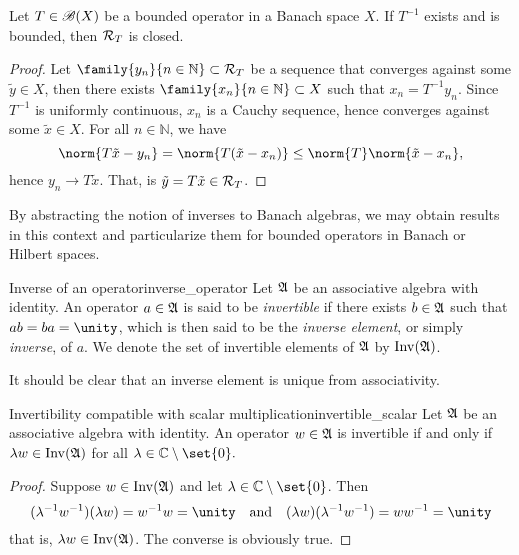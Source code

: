 \begin{corollary}
    Let \(T\in \mathscr{B}(X)\) be a bounded operator in a Banach space \(X\). If \(T^{-1}\) exists and is bounded, then \(\mathcal{R}_{T}\) is closed.
\end{corollary}
\begin{proof}
    Let \(\family{y_n}{n\in \mathbb{N}} \subset \range{T}\) be a sequence that converges against some \(\tilde{y} \in X\), then there exists \(\family{x_n}{n \in \mathbb{N}} \subset X\) such that \(x_n = T^{-1} y_n\). Since \(T^{-1}\) is uniformly continuous, \(x_n\) is a Cauchy sequence, hence converges against some \(\tilde{x} \in X\). For all \(n \in \mathbb{N}\), we have
    \begin{equation*}
        \norm{T\tilde{x} - y_n} = \norm{T(\tilde{x} - x_n)} \leq \norm{T}\norm{\tilde{x} - x_n},
    \end{equation*}
    hence \(y_n \to T\tilde{x}\). That, is \(\tilde{y} = T\tilde{x} \in \mathcal{R}_{T}\).
\end{proof}

By abstracting the notion of inverses to Banach algebras, we may obtain results in this context and particularize them for bounded operators in Banach or Hilbert spaces.
\begin{definition}{Inverse of an operator}{inverse_operator}
    Let \(\mathfrak{A}\) be an associative algebra with identity. An operator \(a \in \mathfrak{A}\) is said to be \emph{invertible} if there exists \(b \in \mathfrak{A}\) such that \(ab = ba = \unity\), which is then said to be the \emph{inverse element}, or simply \emph{inverse}, of \(a\). We denote the set of invertible elements of \(\mathfrak{A}\) by \(\operatorname{Inv}(\mathfrak{A})\).
\end{definition}
\begin{remark}
    It should be clear that an inverse element is unique from associativity.
\end{remark}

\begin{proposition}{Invertibility compatible with scalar multiplication}{invertible_scalar}
    Let \(\mathfrak{A}\) be an associative algebra with identity. An operator \(w \in \mathfrak{A}\) is invertible if and only if \(\lambda w \in \operatorname{Inv}(\mathfrak{A})\) for all \(\lambda \in \mathbb{C} \setminus \set{0}.\)
\end{proposition}
\begin{proof}
    Suppose \(w \in \operatorname{Inv}(\mathfrak{A})\) and let \(\lambda \in \mathbb{C} \setminus \set{0
    }\). Then
    \begin{equation*}
        (\lambda^{-1} w^{-1})(\lambda w) = w^{-1} w = \unity
        \quad\text{and}\quad
        (\lambda w)(\lambda^{-1} w^{-1}) = w w^{-1} = \unity
    \end{equation*}
    that is, \(\lambda w \in \operatorname{Inv}(\mathfrak{A})\). The converse is obviously true.
\end{proof}

